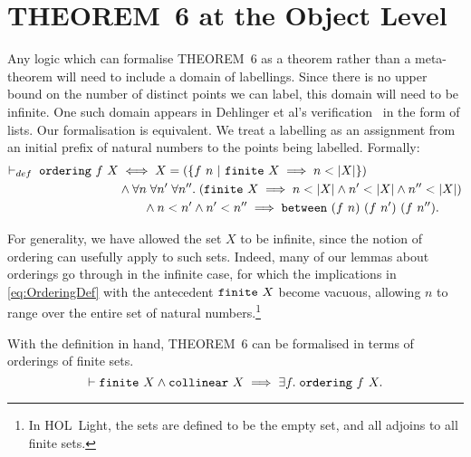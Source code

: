 \section{THEOREM~6 at the Object Level}
Any logic which can formalise THEOREM~6 as a theorem rather than a meta-theorem will need to include a domain of labellings. Since there is no upper bound on the number of distinct points we can label, this domain will need to be infinite. One such domain appears in Dehlinger et al's verification~\cite{DehlingerFOG} in the form of lists. Our formalisation is equivalent. We treat a labelling as an assignment from an initial prefix of natural numbers to the points being labelled. Formally:
\label{sec:OrderingDef}
\begin{equation}\label{eq:OrderingDef}
  \begin{split}
    \vdash_{def}\;\code{ordering}\ f\ X &\iff X = \left(\left\{f\ n\ \vert\ \code{finite}\ X \implies n < \left|X\right|\right\}\right)\\
    &\wedge \forall n\;\forall n'\;\forall n''.\; (\code{finite}\ X \implies n < \left|X\right| \wedge n' < \left|X\right| \wedge n'' < \left|X\right|)\\
    &\qquad\wedge n < n' \wedge n' < n'' \implies \between{(f\ n)}{(f\ n')}{(f\ n'')}.
    \end{split}
\end{equation}

For generality, we have allowed the set $X$ to be infinite, since the notion of ordering can usefully apply to such sets. Indeed, many of our lemmas about orderings go through in the infinite case, for which the implications in \eqref{eq:OrderingDef} with the antecedent $\texttt{finite}\ X$ become vacuous, allowing $n$ to range over the entire set of natural numbers.\footnote{In HOL~Light, the  sets are defined to be the empty set, and all adjoins to all finite sets.} 

With the definition in hand, THEOREM~6 can be formalised in terms of orderings of finite sets.
\begin{equation*}
  \vdash\texttt{finite}\ X \wedge\texttt{collinear}\ X \implies \exists f.\; \texttt{ordering}\ f\ X.
\end{equation*}

